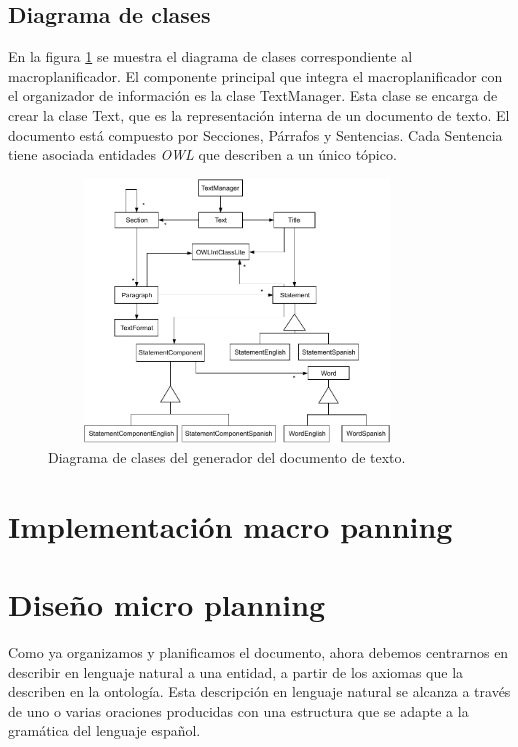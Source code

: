 \subsection{Diagrama de clases}
En la figura \ref{fig:diagrama_clases_macroplanificador} se muestra el diagrama de clases correspondiente al macroplanificador. El componente principal que integra el macroplanificador con el organizador de información es la clase TextManager. Esta clase se encarga de crear la clase Text, que es la representación interna de un documento de texto. El documento está compuesto por Secciones, Párrafos y Sentencias. Cada Sentencia tiene asociada entidades \emph{OWL} que describen a un único tópico.

\begin{figure}[H]
    \centering
    \includegraphics[width=10cm, height=7cm]{img/generacion_documento/diagrama_clases_macroplanificador.pdf}
    \caption{Diagrama de clases del generador del documento de texto.}
    \label{fig:diagrama_clases_macroplanificador}
\end{figure}

\section{Implementación macro panning}

\section{Diseño micro planning}
Como ya organizamos y planificamos el documento, ahora debemos centrarnos en describir en lenguaje natural a una entidad, a partir de los axiomas que la describen en la ontología. Esta descripción en lenguaje natural se alcanza a través de uno o varias oraciones producidas con una estructura que se adapte a la gramática del lenguaje español.

